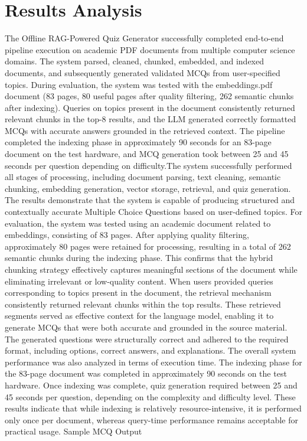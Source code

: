 \documentclass[12pt,a4paper]{report}
\begin{document}
\section{Results Analysis}
The Offline RAG-Powered Quiz Generator successfully completed end-to-end pipeline execution on academic PDF documents from multiple computer science domains. The system parsed, cleaned, chunked, embedded, and indexed documents, and subsequently generated validated MCQs from user-specified topics.
During evaluation, the system was tested with the embeddings.pdf document (83 pages, 80 useful pages after quality filtering, 262 semantic chunks after indexing). Queries on topics present in the document consistently returned relevant chunks in the top-8 results, and the LLM generated correctly formatted MCQs with accurate answers grounded in the retrieved context. The pipeline completed the indexing phase in approximately 90 seconds for an 83-page document on the test hardware, and MCQ generation took between 25 and 45 seconds per question depending on difficulty.The system successfully performed all stages of processing, including document parsing, text cleaning, semantic chunking, embedding generation, vector storage, retrieval, and quiz generation. The results demonstrate that the system is capable of producing structured and contextually accurate Multiple Choice Questions based on user-defined topics.
For evaluation, the system was tested using an academic document related to embeddings, consisting of 83 pages. After applying quality filtering, approximately 80 pages were retained for processing, resulting in a total of 262 semantic chunks during the indexing phase. This confirms that the hybrid chunking strategy effectively captures meaningful sections of the document while eliminating irrelevant or low-quality content.
When users provided queries corresponding to topics present in the document, the retrieval mechanism consistently returned relevant chunks within the top results. These retrieved segments served as effective context for the language model, enabling it to generate MCQs that were both accurate and grounded in the source material. The generated questions were structurally correct and adhered to the required format, including options, correct answers, and explanations.
The overall system performance was also analyzed in terms of execution time. The indexing phase for the 83-page document was completed in approximately 90 seconds on the test hardware. Once indexing was complete, quiz generation required between 25 and 45 seconds per question, depending on the complexity and difficulty level. These results indicate that while indexing is relatively resource-intensive, it is performed only once per document, whereas query-time performance remains acceptable for practical usage.
Sample MCQ Output
\end{document}
